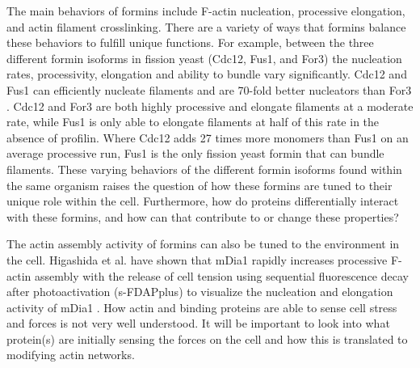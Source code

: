 The main behaviors of formins include F-actin nucleation, processive elongation, and actin filament crosslinking. There are a variety of ways that formins balance these behaviors to fulfill unique functions. For example, between the three different formin isoforms in fission yeast (Cdc12, Fus1, and For3) the nucleation rates, processivity, elongation and ability to bundle vary significantly. Cdc12 and Fus1 can efficiently nucleate filaments and are 70-fold better nucleators than For3 \citep{scott_functionally_2011}. Cdc12 and For3 are both highly processive and elongate filaments at a moderate rate, while Fus1 is only able to elongate filaments at half of this rate in the absence of profilin. Where Cdc12 adds 27 times more monomers than Fus1 on an average processive run, Fus1 is the only fission yeast formin that can bundle filaments. These varying behaviors of the different formin isoforms found within the same organism raises the question of how these formins are tuned to their unique role within the cell. Furthermore, how do proteins differentially interact with these formins, and how can that contribute to or change these properties?

The actin assembly activity of formins can also be tuned to the environment in the cell. Higashida et al. have shown that mDia1 rapidly increases processive F-actin assembly with the release of cell tension using sequential fluorescence decay after photoactivation (s-FDAPplus) to visualize the nucleation and elongation activity of mDia1 \citep{higashida_f-_2013}. How actin and binding proteins are able to sense cell stress and forces is not very well understood. It will be important to look into what protein(s) are initially sensing the forces on the cell and how this is translated to modifying actin networks. 

